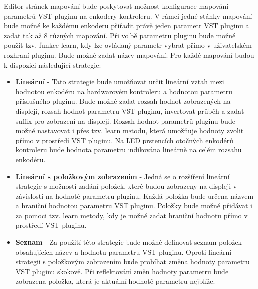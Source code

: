 \documentclass[thesis=M,czech]{FITthesis}[2019/03/06]
\begin{document}
		Editor stránek mapování bude poskytovat možnost konfigurace mapování parametrů VST pluginu na enkodery kontroleru.
		V rámci jedné stánky mapování bude možné ke každému enkoderu přiřadit právě jeden parametr VST pluginu a zadat tak až 8 různých mapování.
		Při volbě parametru pluginu bude možné použít tzv. funkce learn, kdy lze ovládaný parametr vybrat přímo v uživatelském rozhraní pluginu.
		Bude možné zadat název mapování.
		Pro každé mapování budou k dispozici následující strategie:
		\begin{itemize}
			\item\label{LinearMappingStrategy} \textbf{Lineární} - Tato strategie bude umožňovat určit lineární vztah mezi hodnotou enkodéru na hardwarovém kontroleru 
			a hodnotou parametru příslušného pluginu. Bude možné zadat rozsah hodnot zobrazených na displeji, rozsah hodnot parametru VST pluginu, invertovat
			průběh a zadat suffix pro zobrazení na displeji. Rozsah hodnot parametrů pluginu bude možné nastavovat i přes tzv. learn metodu, která 
			umožňuje hodnoty zvolit přímo v prostředí VST pluginu. Na LED prstencích otočných enkodérů kontroleru bude hodnota parametru indikována lineárně na celém rozsahu enkodéru.
			
			\item \textbf{Lineární s položkovým zobrazením} - Jedná se o rozšíření lineární strategie s možností zadání položek, které
			budou zobrazeny na displeji v závislosti na hodnotě parametru pluginu. Každá položka bude určena názvem a hraniční hodnotou parametru VST pluginu.
			Položky bude možné přidávat i za pomoci tzv. learn metody, kdy je možné zadat hraniční hodnotu přímo v prostředí VST pluginu.

			\item \textbf{Seznam} - Za použití této strategie bude možné definovat seznam položek obsahujících název a hodnotu parametru VST pluginu.
			Oproti lineární strategii s položkovým zobrazením bude probíhat změna hodnoty parametru VST pluginu skokově. Při reflektování změn hodnoty parametru bude zobrazena
			položka, která je aktuální hodnotě parametru nejblíže.
		\end{itemize}
		
\end{document}
